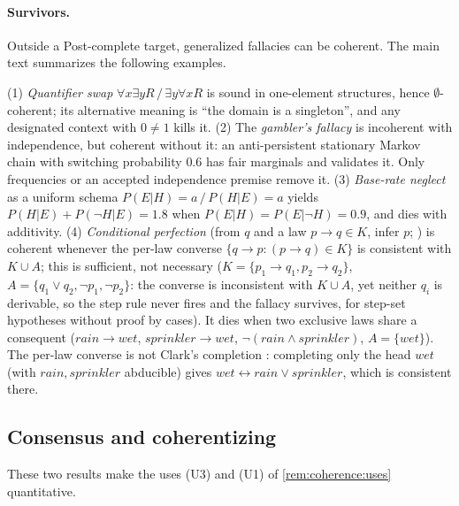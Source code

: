 \paragraph{Survivors.} Outside a Post-complete target, generalized fallacies can be coherent. The main text summarizes the following examples.

\begin{example}[Survivors]\label{ex:coherence:survivors}
\textup{(1)} \emph{Quantifier swap} $\forall x\exists yR\,/\,\exists y\forall xR$ is sound in one-element structures, hence $\emptyset$-coherent; its alternative meaning is ``the domain is a singleton'', and any designated context with $0\neq1$ kills it. \textup{(2)} The \emph{gambler's fallacy} is incoherent with independence, but coherent without it: an anti-persistent stationary Markov chain with switching probability $0.6$ has fair marginals and validates it. Only frequencies or an accepted independence premise remove it. \textup{(3)} \emph{Base-rate neglect} as a uniform schema $P(E|H)=a\,/\,P(H|E)=a$ yields $P(H|E)+P(\neg H|E)=1.8$ when $P(E|H)=P(E|\neg H)=0.9$, and dies with additivity. \textup{(4)} \emph{Conditional perfection} (from $q$ and a law $p\to q\in K$, infer $p$; \citealt{geis1971invited}) is coherent whenever the per-law converse $\{q\to p:(p\to q)\in K\}$ is consistent with $K\cup A$; this is sufficient, not necessary ($K=\{p_1\to q_1,p_2\to q_2\}$, $A=\{q_1\vee q_2,\neg p_1,\neg p_2\}$: the converse is inconsistent with $K\cup A$, yet neither $q_i$ is derivable, so the step rule never fires and the fallacy survives, for step-set hypotheses without proof by cases). It dies when two exclusive laws share a consequent ($\mathit{rain}\to\mathit{wet}$, $\mathit{sprinkler}\to\mathit{wet}$, $\neg(\mathit{rain}\wedge\mathit{sprinkler})$, $A=\{\mathit{wet}\}$). The per-law converse is not Clark's completion \citep{clark1978negation}: completing only the head $\mathit{wet}$ (with $\mathit{rain},\mathit{sprinkler}$ abducible) gives $\mathit{wet}\leftrightarrow\mathit{rain}\vee\mathit{sprinkler}$, which is consistent there.
\end{example}

\subsection{Consensus and coherentizing}\label{app:coherence:eliminative}

These two results make the uses (U3) and (U1) of \cref{rem:coherence:uses} quantitative.

